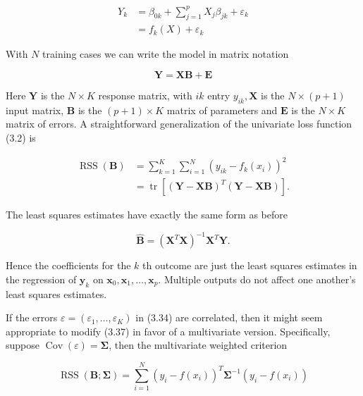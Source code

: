 \documentclass[10pt]{article}
\begin{document}
\begin{align*}
Y_{k} & =\beta_{0 k}+\sum_{j=1}^{p} X_{j} \beta_{j k}+\varepsilon_{k}  \tag{3.34}\\
& =f_{k}(X)+\varepsilon_{k} \tag{3.35}
\end{align*}


With $N$ training cases we can write the model in matrix notation


\begin{equation*}
\mathbf{Y}=\mathbf{X B}+\mathbf{E} \tag{3.36}
\end{equation*}


Here $\mathbf{Y}$ is the $N \times K$ response matrix, with $i k$ entry $y_{i k}, \mathbf{X}$ is the $N \times(p+1)$ input matrix, $\mathbf{B}$ is the $(p+1) \times K$ matrix of parameters and $\mathbf{E}$ is the $N \times K$ matrix of errors. A straightforward generalization of the univariate loss function (3.2) is


\begin{align*}
\operatorname{RSS}(\mathbf{B}) & =\sum_{k=1}^{K} \sum_{i=1}^{N}\left(y_{i k}-f_{k}\left(x_{i}\right)\right)^{2}  \tag{3.37}\\
& =\operatorname{tr}\left[(\mathbf{Y}-\mathbf{X B})^{T}(\mathbf{Y}-\mathbf{X B})\right] . \tag{3.38}
\end{align*}


The least squares estimates have exactly the same form as before


\begin{equation*}
\hat{\mathbf{B}}=\left(\mathbf{X}^{T} \mathbf{X}\right)^{-1} \mathbf{X}^{T} \mathbf{Y} . \tag{3.39}
\end{equation*}


Hence the coefficients for the $k$ th outcome are just the least squares estimates in the regression of $\mathbf{y}_{k}$ on $\mathbf{x}_{0}, \mathbf{x}_{1}, \ldots, \mathbf{x}_{p}$. Multiple outputs do not affect one another's least squares estimates.

If the errors $\varepsilon=\left(\varepsilon_{1}, \ldots, \varepsilon_{K}\right)$ in (3.34) are correlated, then it might seem appropriate to modify (3.37) in favor of a multivariate version. Specifically, suppose $\operatorname{Cov}(\varepsilon)=\boldsymbol{\Sigma}$, then the multivariate weighted criterion


\begin{equation*}
\operatorname{RSS}(\mathbf{B} ; \boldsymbol{\Sigma})=\sum_{i=1}^{N}\left(y_{i}-f\left(x_{i}\right)\right)^{T} \boldsymbol{\Sigma}^{-1}\left(y_{i}-f\left(x_{i}\right)\right) \tag{3.40}
\end{equation*}
\end{document}
